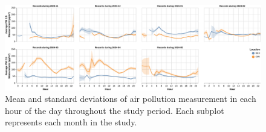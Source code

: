\begin{figure}
    \centering
    \includegraphics[width=\textwidth]{figures/average-hourly-pollution.pdf}%
    \caption{Mean and standard deviations of air pollution measurement in each hour of the day throughout the study period.
    Each subplot represents each month in the study. }%
    \Description{}
    \label{fig:hourly-work-aqi}%
\end{figure}%


